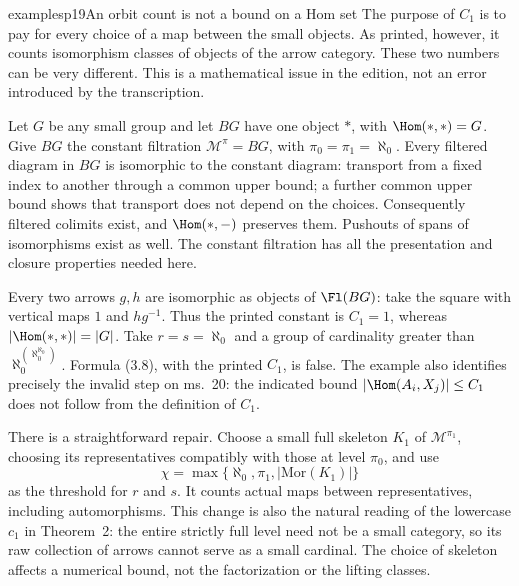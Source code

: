 \begin{dcomment}{examples}{p19}{An orbit count is not a bound on a Hom set}
The purpose of $C_1$ is to pay for every choice of a map between the small objects. As printed, however, it counts isomorphism classes of objects of the arrow category. These two numbers can be very different. This is a mathematical issue in the edition, not an error introduced by the transcription.

Let $G$ be any small group and let $BG$ have one object $*$, with $\Hom(*,*)=G$. Give $BG$ the constant filtration $\mathcal M^\pi=BG$, with $\pi_0=\pi_1=\aleph_0$. Every filtered diagram in $BG$ is isomorphic to the constant diagram: transport from a fixed index to another through a common upper bound; a further common upper bound shows that transport does not depend on the choices. Consequently filtered colimits exist, and $\Hom(*,-)$ preserves them. Pushouts of spans of isomorphisms exist as well. The constant filtration has all the presentation and closure properties needed here.

Every two arrows $g,h$ are isomorphic as objects of $\Fl(BG)$: take the square with vertical maps $1$ and $hg^{-1}$. Thus the printed constant is $C_1=1$, whereas $|\Hom(*,*)|=|G|$. Take $r=s=\aleph_0$ and a group of cardinality greater than $\aleph_0^{(\aleph_0^{\aleph_0})}$. Formula (3.8), with the printed $C_1$, is false. The example also identifies precisely the invalid step on ms.~20: the indicated bound $|\Hom(A_i,X_j)|\leq C_1$ does not follow from the definition of $C_1$.

There is a straightforward repair. Choose a small full skeleton $K_1$ of $\mathcal M^{\pi_1}$, choosing its representatives compatibly with those at level $\pi_0$, and use
\[
\chi=\max\{\aleph_0,\pi_1,|\mathrm{Mor}(K_1)|\}
\]
as the threshold for $r$ and $s$. It counts actual maps between representatives, including automorphisms. This change is also the natural reading of the lowercase $c_1$ in Theorem~2: the entire strictly full level need not be a small category, so its raw collection of arrows cannot serve as a small cardinal. The choice of skeleton affects a numerical bound, not the factorization or the lifting classes.
\end{dcomment}

